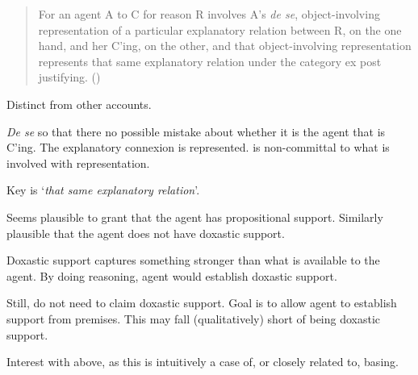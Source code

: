 \begin{note}
    \begin{quote}
    For an agent A to C for reason R involves A’s \emph{de se}, object-involving representation of a particular explanatory relation between R, on the one hand, and her C’ing, on the other, and that object-involving representation represents that same explanatory relation under the category ex post justifying.\nolinebreak
    \mbox{}\hfill\mbox{(\citeyear[204]{Neta:2019aa})}
  \end{quote}
  Distinct from other accounts.

  \emph{De se} so that there no possible mistake about whether it is the agent that is C'ing.
  The explanatory connexion is represented.
  \citeauthor{Neta:2019aa} is non-committal to what is involved with representation.

  Key is `\emph{that same explanatory relation}'.
\end{note}

\begin{note}[Summarising]
  Seems plausible to grant that the agent has propositional support.
  Similarly plausible that the agent does not have doxastic support.

  Doxastic support captures something stronger than what is available to the agent.
  By doing reasoning, agent would establish doxastic support.

  Still, do not need to claim doxastic support.
  Goal is to allow agent to establish support from premises.
  This may fall (qualitatively) short of being doxastic support.

  Interest with above, as this is intuitively a case of, or closely related to, basing.
\end{note}

